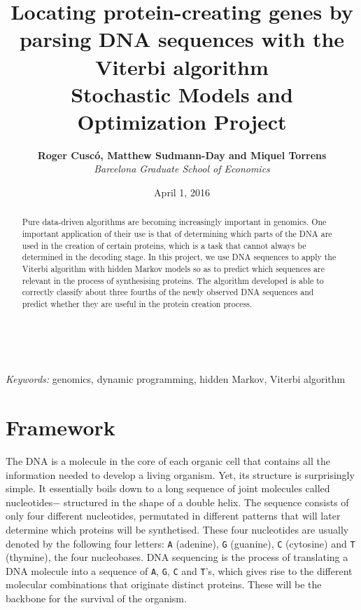 \documentclass[a4paper, 11pt]{article} %
\title{\textbf{Locating protein-creating genes by parsing DNA sequences with the Viterbi algorithm}\\ %
\vspace{0.5cm}
{\Large Stochastic Models and Optimization Project}} %
\author{\textbf{Roger Cusc\'o, Matthew Sudmann-Day and Miquel Torrens} %
\vspace{0.1cm}
\\{{\large \textit{Barcelona Graduate School of Economics}}}} %
\date{\vspace{0.5cm} {\large April 1, 2016}} %
\makeatletter
\renewcommand{\maketitle}{ %
\begin{flushright} %
{\LARGE\@title} %

\vspace{50pt} %

{\large\@author} %
\\\@date %

\vspace{40pt} %
\end{flushright}
}
\makeatother
\begin{document}
\maketitle %



\begin{abstract}
Pure data-driven algorithms are becoming increasingly important in genomics. One important application of their use is that of determining which parts of the DNA are used in the creation of certain proteins, which is a task that cannot always be determined in the decoding stage. In this project, we use DNA sequences to apply the Viterbi algorithm with hidden Markov models so as to predict which sequences are relevant in the process of synthesising proteins. The algorithm developed is able to correctly classify about three fourths of the newly observed DNA sequences and predict whether they are useful in the protein creation process.
\end{abstract}

\hspace*{3,6mm}\textit{Keywords:} genomics, dynamic programming, hidden Markov, Viterbi algorithm %

\vspace{30pt} %


\section*{Framework}

The DNA is a molecule in the core of each organic cell that contains all the information needed to develop a living organism. Yet, its structure is surprisingly simple. It essentially boils down to a long sequence of joint molecules \textendash called nucleotides$-$ structured in the shape of a double helix. The sequence consists of only four different nucleotides, permutated in different patterns that will later determine which proteins will be synthetised. These four nucleotides are usually denoted by the following four letters: \texttt{A} (adenine), \texttt{G} (guanine), \texttt{C} (cytosine) and \texttt{T} (thymine), the four nucleobases. DNA sequencing is the process of translating a DNA molecule into a sequence of \texttt{A}, \texttt{G}, \texttt{C} and \texttt{T}'s, which gives rise to the different molecular combinations that originate distinct proteins. These will be the backbone for the survival of the organism.
\end{document}
